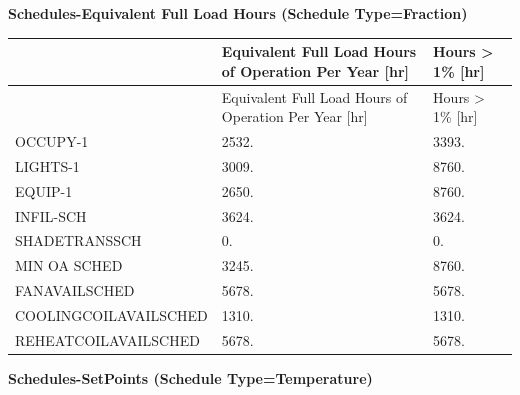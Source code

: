 \textbf{Schedules-Equivalent Full Load Hours (Schedule Type=Fraction)}
\begin{longtable}[c]{@{}lll@{}}

\toprule
 & Equivalent Full Load Hours of Operation Per Year [hr] & Hours > 1\% [hr] \tabularnewline
\midrule
\endfirsthead

\toprule
 & Equivalent Full Load Hours of Operation Per Year [hr] & Hours > 1\% [hr] \tabularnewline
\midrule
\endhead

    OCCUPY-1              &        2532.                                          &        3393.     \tabularnewline
    LIGHTS-1              &        3009.                                          &        8760.     \tabularnewline
    EQUIP-1               &        2650.                                          &        8760.     \tabularnewline
    INFIL-SCH             &        3624.                                          &        3624.     \tabularnewline
    SHADETRANSSCH         &           0.                                          &           0.     \tabularnewline
    MIN OA SCHED          &        3245.                                          &        8760.     \tabularnewline
    FANAVAILSCHED         &        5678.                                          &        5678.     \tabularnewline
    COOLINGCOILAVAILSCHED &        1310.                                          &        1310.     \tabularnewline
    REHEATCOILAVAILSCHED  &        5678.                                          &        5678.     \tabularnewline

\bottomrule
\end{longtable}

\textbf{Schedules-SetPoints (Schedule Type=Temperature)}

